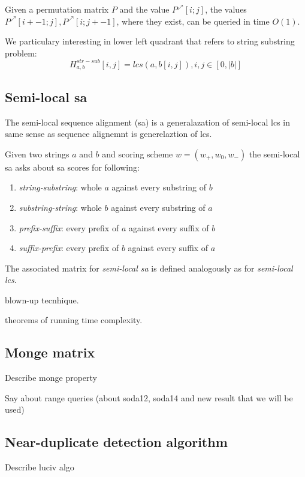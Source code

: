 \begin{proposition}
Given a permutation matrix $P$ and the value
$P^{\nearrow}[i; j]$, the values $P^{\nearrow}[i +- 1; j], P^{\nearrow}[i; j +- 1]$, where they exist, can
be queried in time $O(1)$\cite{}.
\end{proposition}


We particulary interesting in lower left quadrant that refers to string substring problem:
\begin{equation}
H_{a,b}^{str-sub}[i,j] = lcs(a,b[i,j]),i,j \in [0,|b|] 
\end{equation}



\subsection{Semi-local sa}
The semi-local sequence alignment (sa) is a generalazation of semi-local lcs in same sense as sequence alignemnt is generelaztion of lcs.

Given two strings $a$ and $b$ and scoring scheme $w=(w_{+},w_{0},w_{-})$  the semi-local sa  asks about
sa scores for following:
\begin{enumerate}
\item \emph{string-substring}: whole $a$ against every substring of $b$
\item \emph{substring-string}: whole $b$ against every substring of $a$
\item \emph{prefix-suffix}: every prefix of $a$ against every suffix of $b$
\item \emph{suffix-prefix}: every prefix of $b$ against every suffix of $a$
\end{enumerate} 

The associated matrix for \emph{semi-local sa} is defined analogously as for \emph{semi-local lcs}.



blown-up tecnhique.

theorems of running time complexity.

 
\subsection{Monge matrix}
Describe monge property  


Say about range queries (about soda12, soda14 and new result that we will be used)

\subsection{Near-duplicate detection algorithm}

Describe luciv algo


